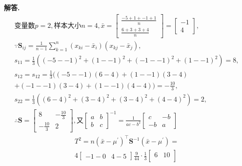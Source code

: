 \documentclass[12pt, a4paper, oneside]{ctexart}
\newenvironment{solution}{\par\noindent\textbf{解答. }}{\par}
\begin{document}
\begin{solution}
        \[
        \begin{gathered}
            \text{变量数}p=2,\text{样本大小}n=4,
            \bar{x}=\begin{bmatrix}
                \frac{-5+1+-1+1}{n}\\
                \frac{6+3+3+4}{n}
            \end{bmatrix}
            =\begin{bmatrix}
                -1\\
                4
            \end{bmatrix},\\
            \because
            \mathbf{S}_{ij} = \frac{1}{n-1} \sum_{k=1}^{n} (x_{ki} - \bar{x}_i)(x_{kj} - \bar{x}_j) ,\\
            s_{11}=\frac{1}{3}((-5--1)^2+(1--1)^2+(-1--1)^2+(1--1)^2)=8,\\
            s_{12}=s_{12}=\frac{1}{3}((-5--1)(6-4)+(1--1)(3-4)\\+(-1--1)(3-4)+(1--1)(4-4))=-\frac{10}{3},\\
            s_{22}=\frac{1}{3}((6-4)^2+(3-4)^2+(3-4)^2+(4-4)^2)=2,\\
            \therefore 
            \mathbf{S}=\begin{bmatrix}
                8 & -\frac{10}{3}\\
                -\frac{10}{3} & 2
            \end{bmatrix},\text{又}
            \begin{bmatrix}
                a & b\\
                b & c
            \end{bmatrix}^{-1}=\frac{1}{ac-b^{2}}\begin{bmatrix}
                c & -b\\
                -b & a
            \end{bmatrix}
        \end{gathered}
    \]
    \[
        \begin{gathered}
            T^{2}=n(\bar{x} - \mu^\prime)^\top \mathbf{S}^{-1} (\bar{x} - \mu^\prime)=\\
            4\begin{bmatrix}
                -1-0 & 4-5
            \end{bmatrix}  \frac{9}{44} \cdot \frac{1}{3}
            \begin{bmatrix}
                6 & 10\\

\end{bmatrix}
\end{gathered}\]
\end{solution}
\end{document}
